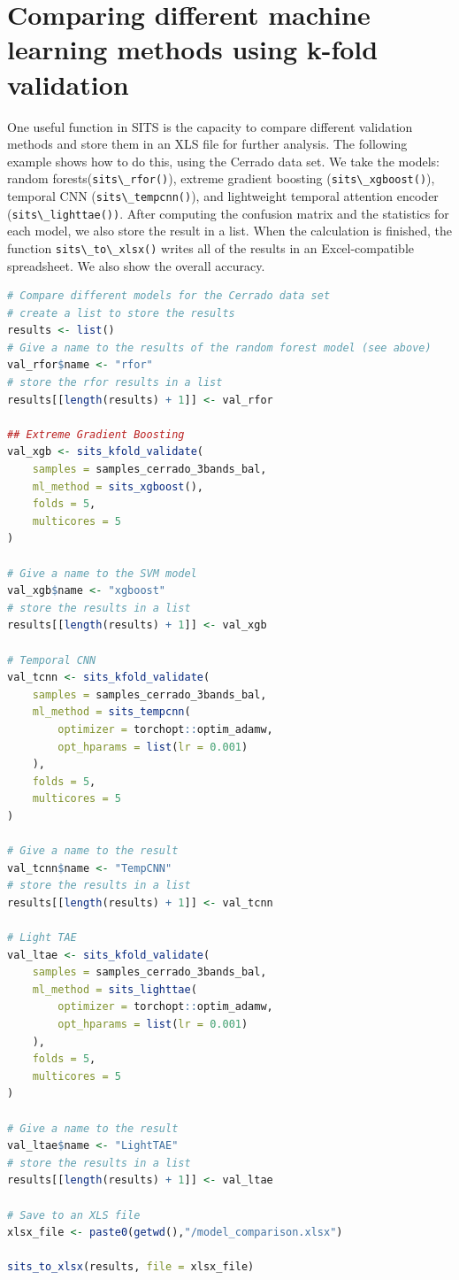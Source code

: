 \documentclass[
  11pt,
]{report}
\newcommand{\passthrough}[1]{#1}
\begin{document}
\hypertarget{comparing-different-machine-learning-methods-using-k-fold-validation}{%
\section*{Comparing different machine learning methods using k-fold
validation}\label{comparing-different-machine-learning-methods-using-k-fold-validation}}

One useful function in SITS is the capacity to compare different
validation methods and store them in an XLS file for further analysis.
The following example shows how to do this, using the Cerrado data set.
We take the models: random
forests(\passthrough{\lstinline!sits\_rfor()!}), extreme gradient
boosting (\passthrough{\lstinline!sits\_xgboost()!}), temporal CNN
(\passthrough{\lstinline!sits\_tempcnn()!}), and lightweight temporal
attention encoder (\passthrough{\lstinline!sits\_lighttae())!}. After
computing the confusion matrix and the statistics for each model, we
also store the result in a list. When the calculation is finished, the
function \passthrough{\lstinline!sits\_to\_xlsx()!} writes all of the
results in an Excel-compatible spreadsheet. We also show the overall
accuracy.

\begin{lstlisting}[language=R]
# Compare different models for the Cerrado data set
# create a list to store the results
results <- list()
# Give a name to the results of the random forest model (see above)
val_rfor$name <- "rfor"
# store the rfor results in a list
results[[length(results) + 1]] <- val_rfor

## Extreme Gradient Boosting
val_xgb <- sits_kfold_validate(
    samples = samples_cerrado_3bands_bal,
    ml_method = sits_xgboost(),
    folds = 5,
    multicores = 5
)

# Give a name to the SVM model
val_xgb$name <- "xgboost"
# store the results in a list
results[[length(results) + 1]] <- val_xgb

# Temporal CNN
val_tcnn <- sits_kfold_validate(
    samples = samples_cerrado_3bands_bal,
    ml_method = sits_tempcnn(
        optimizer = torchopt::optim_adamw,
        opt_hparams = list(lr = 0.001)
    ),
    folds = 5,
    multicores = 5
)

# Give a name to the result
val_tcnn$name <- "TempCNN"
# store the results in a list
results[[length(results) + 1]] <- val_tcnn

# Light TAE
val_ltae <- sits_kfold_validate(
    samples = samples_cerrado_3bands_bal,
    ml_method = sits_lighttae(
        optimizer = torchopt::optim_adamw,
        opt_hparams = list(lr = 0.001)
    ),
    folds = 5,
    multicores = 5
)

# Give a name to the result
val_ltae$name <- "LightTAE"
# store the results in a list
results[[length(results) + 1]] <- val_ltae

# Save to an XLS file
xlsx_file <- paste0(getwd(),"/model_comparison.xlsx")

sits_to_xlsx(results, file = xlsx_file)
\end{lstlisting}
\end{document}
